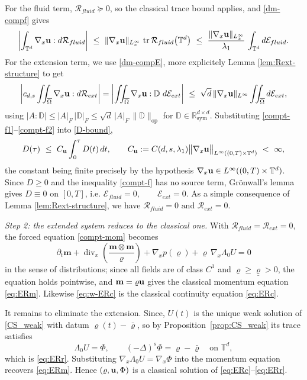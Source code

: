 \documentclass[12pt,a4paper,twoside]{article}
\newcommand{\Div}{\operatorname{div}}
\newcommand{\vr}{\varrho}
\newcommand{\vu}{\vc{u}}
\newcommand{\vc}[1]{{\bf #1}}
\newcommand{\Grad}{\nabla}
\numberwithin{equation}{section}%
\newcommand{\T}{\mathbb{T}}
\begin{document}
\begin{pf}
	For the fluid term, $\mathcal R_{fluid}\succeq0$, so the classical trace bound applies, and \eqref{dm-compf} gives
	\begin{equation}\label{compt-f1}
		\left| \int_{\mathbb T^d} \Grad_x\vu : d\mathcal R_{fluid} \right|
		\ \le\ \|\Grad_x\vu\|_{L^\infty_x}\, \operatorname{tr}\mathcal R_{fluid}\big(\mathbb T^d\big)
		\ \le\ \frac{\|\Grad_x\vu\|_{L^\infty_x}}{\lambda_1}\, \int_{\mathbb T^d} d\mathcal E_{fluid} .
	\end{equation}
	For the extension term, we use \eqref{dm-compE}, more explicitely Lemma \ref{lem:Rext-structure} to get
	\begin{equation}\label{compt-f2}
		\left| c_{d,s}\iint_{\overline\Omega} \Grad_x\vu : d\mathcal R_{ext} \right|
		= \left| \iint_{\overline\Omega} \Grad_x\vu : \mathbb D \ d\mathcal E_{ext} \right|
		\ \le\ \sqrt d\,\|\Grad_x\vu\|_{L^\infty} \iint_{\overline\Omega} d\mathcal E_{ext},
	\end{equation}
	using $|A : \mathbb D| \le |A|_F\,|\mathbb D|_F \le \sqrt d\,|A|_F\,\|\mathbb D\|_{\mathrm{op}}$ for $\mathbb D \in \mathbb R^{d\times d}_{\mathrm{sym}}$. Substituting \eqref{compt-f1}--\eqref{compt-f2} into \eqref{D-bound},
	\begin{equation}\label{compt-f}
		D(\tau) \ \le\ C_{\vu} \int_0^\tau D(t)\,dt,
		\qquad
		C_{\vu} := C(d,s,\lambda_1) \big\| \Grad_x\vu \big\|_{L^\infty((0,T)\times\mathbb T^d)} \ <\ \infty,
	\end{equation}
	the constant being finite precisely by the hypothesis $\Grad_x\vu\in L^\infty((0,T)\times \T^d)$. Since $D\ge0$ and the inequality \eqref{compt-f} has no source term, Gr\"onwall's lemma gives $D\equiv 0$ on $[0,T]$, i.e. $	\mathcal E_{fluid} = 0, \qquad \mathcal E_{ext} = 0 $. As a simple consequence of Lemma \ref{lem:Rext-structure}, we have  $ 	 \mathcal R_{fluid} = 0 \text{ and } \mathcal R_{ext} = 0$.

	
	\medskip
	\emph{Step 2: the extended system reduces to the classical one.} With $\mathcal R_{fluid} = \mathcal R_{ext} = 0$, the forced equation \eqref{compt-mom} becomes
	\[
	\partial_t \mathbf m + \Div_x\!\left( \frac{\mathbf m\otimes\mathbf m}{\vr} \right) + \Grad_x p(\vr) + \vr\,\Grad_x\Lambda_0 U = 0
	\]
	in the sense of distributions; since all fields are of class $C^1$ and $\displaystyle \vr\ge\underline\vr>0$, the equation holds pointwise, and $\mathbf m = \vr\vu$ gives the classical momentum equation \eqref{eq:ERm}. Likewise \eqref{eq:w-ERc} is the classical continuity equation \eqref{eq:ERc}.
	
	It remains to eliminate the extension. Since, $U(t)$ is the unique weak solution of \eqref{CS_weak} with datum $\vr(t)-\bar\vr$, so by Proposition~\ref{prop:CS_weak} its trace satisfies
	\[
	\Lambda_0 U = \Phi, \qquad (-\Delta)^s \Phi = \vr - \bar\vr \quad\text{on } \mathbb T^d ,
	\]
	which is \eqref{eq:ERr}. Substituting $\Grad_x\Lambda_0 U = \Grad_x\Phi$ into the momentum equation recovers \eqref{eq:ERm}. Hence $(\vr,\vu,\Phi)$ is a classical solution of \eqref{eq:ERc}--\eqref{eq:ERr}.
\end{pf}
\end{document}
